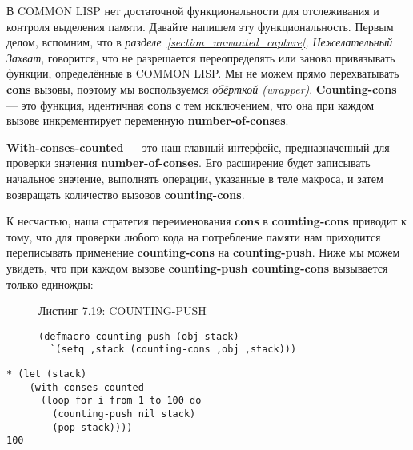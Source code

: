 В COMMON LISP нет достаточной функциональности для отслеживания и контроля выделения памяти. Давайте напишем эту функциональность. Первым делом, вспомним, что в \emph{разделе~\ref{section_unwanted_capture}, Нежелательный Захват}, говорится, что не разрешается переопределять или заново привязывать функции, определённые в COMMON LISP. Мы не можем прямо перехватывать \textbf{cons} вызовы, поэтому мы воспользуемся \emph{обёрткой (wrapper)}. \textbf{Counting-cons} --- это функция, идентичная \textbf{cons} с тем исключением, что она при каждом вызове инкрементирует переменную \textbf{number-of-conses}.

\textbf{With-conses-counted} --- это наш главный интерфейс, предназначенный для проверки значения \textbf{number-of-conses}. Его расширение будет записывать начальное значение, выполнять операции, указанные в теле макроса, и затем возвращать количество вызовов \textbf{counting-cons}.

К несчастью, наша стратегия переименования \textbf{cons} в \textbf{counting-cons} приводит к тому, что для проверки любого кода на потребление памяти нам приходится переписывать применение \textbf{counting-cons} на \textbf{counting-push}. Ниже мы можем увидеть, что при каждом вызове \textbf{counting-push counting-cons} вызывается только единожды:

\begin{figure}Листинг 7.19: COUNTING-PUSH\label{listing_7.19}
\listbegin
\begin{verbatim}
(defmacro counting-push (obj stack)
  `(setq ,stack (counting-cons ,obj ,stack)))
\end{verbatim}
\listend
\end{figure}

\begin{verbatim}
* (let (stack)
    (with-conses-counted
      (loop for i from 1 to 100 do
        (counting-push nil stack)
        (pop stack))))
100
\end{verbatim}

